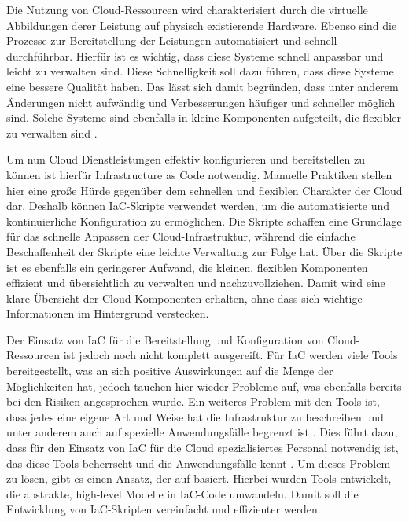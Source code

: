 \documentclass[biblatex]{lni}
\begin{document}
Die Nutzung von Cloud-Ressourcen wird charakterisiert durch die virtuelle Abbildungen derer Leistung auf physisch existierende Hardware. Ebenso sind die Prozesse zur Bereitstellung der Leistungen automatisiert und schnell durchführbar. Hierfür ist es wichtig, dass diese Systeme schnell anpassbar und leicht zu verwalten sind. Diese Schnelligkeit soll dazu führen, dass diese Systeme eine bessere Qualität haben. Das lässt sich damit begründen, dass unter anderem Änderungen nicht aufwändig und Verbesserungen häufiger und schneller möglich sind. Solche Systeme sind ebenfalls in kleine Komponenten aufgeteilt, die flexibler zu verwalten sind \cite{Morris.December2020}.

Um nun Cloud Dienstleistungen effektiv konfigurieren und bereitstellen zu können ist hierfür Infrastructure as Code notwendig. Manuelle Praktiken stellen hier eine große Hürde gegenüber dem schnellen und flexiblen Charakter der Cloud dar. Deshalb können IaC-Skripte verwendet werden, um die automatisierte und kontinuierliche Konfiguration zu ermöglichen. Die Skripte schaffen eine Grundlage für das schnelle Anpassen der Cloud-Infrastruktur, während die einfache Beschaffenheit der Skripte eine leichte Verwaltung zur Folge hat. Über die Skripte ist es ebenfalls ein geringerer Aufwand, die kleinen, flexiblen Komponenten effizient und übersichtlich zu verwalten und nachzuvollziehen. Damit wird eine klare Übersicht der Cloud-Komponenten erhalten, ohne dass sich wichtige Informationen im Hintergrund verstecken.

Der Einsatz von IaC für die Bereitstellung und Konfiguration von Cloud-Ressourcen ist jedoch noch nicht komplett ausgereift. Für IaC werden viele Tools bereitgestellt, was an sich positive Auswirkungen auf die Menge der Möglichkeiten hat, jedoch tauchen hier wieder Probleme auf, was ebenfalls bereits bei den Risiken angesprochen wurde. Ein weiteres Problem mit den Tools ist, dass jedes eine eigene Art und Weise hat die Infrastruktur zu beschreiben und unter anderem auch auf spezielle Anwendungsfälle begrenzt ist \cite{Bhattacharjee.}. Dies führt dazu, dass für den Einsatz von IaC für die Cloud spezialisiertes Personal notwendig ist, das diese Tools beherrscht und die Anwendungsfälle kennt \cite{Artac.2018}. Um dieses Problem zu lösen, gibt es einen Ansatz, der auf  basiert. Hierbei wurden Tools entwickelt, die abstrakte, high-level Modelle in IaC-Code umwandeln. Damit soll die Entwicklung von IaC-Skripten vereinfacht und effizienter werden.
\end{document}
